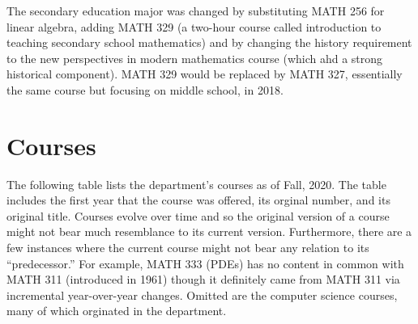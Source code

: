 \documentclass[
]{book}
\begin{document}
The secondary education major was changed by substituting MATH 256 for linear algebra, adding MATH 329 (a two-hour course called introduction to teaching secondary school mathematics) and by changing the history requirement to the new perspectives in modern mathematics course (which ahd a strong historical component).
MATH 329 would be replaced by MATH 327, essentially the same course but focusing on middle school, in 2018.

\hypertarget{courses}{%
\chapter{Courses}\label{courses}}

The following table lists the department's courses as of Fall, 2020. The table includes the first year that the course was offered, its orginal number, and its original title. Courses evolve over time and so the original version of a course might not bear much resemblance to its current version. Furthermore, there are a few instances where the current course might not bear any relation to its ``predecessor.'' For example, MATH 333 (PDEs) has no content in common with MATH 311 (introduced in 1961) though it definitely came from MATH 311 via incremental year-over-year changes. Omitted are the computer science courses, many of which orginated in the department.
\end{document}
